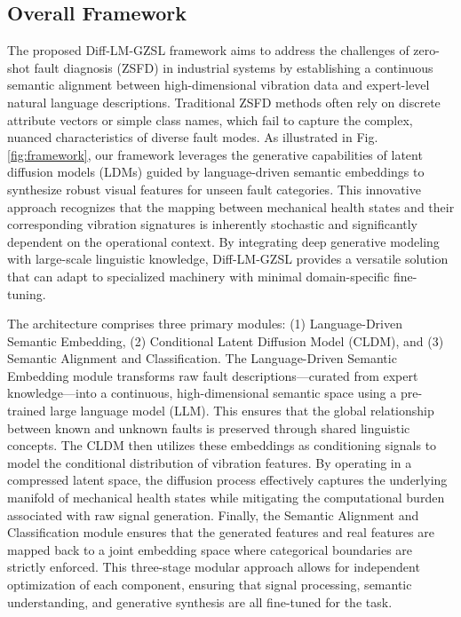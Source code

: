 \subsection{Overall Framework}
\label{sec:framework}
The proposed Diff-LM-GZSL framework aims to address the challenges of zero-shot fault diagnosis (ZSFD) in industrial systems by establishing a continuous semantic alignment between high-dimensional vibration data and expert-level natural language descriptions. Traditional ZSFD methods often rely on discrete attribute vectors or simple class names, which fail to capture the complex, nuanced characteristics of diverse fault modes. As illustrated in Fig. \ref{fig:framework}, our framework leverages the generative capabilities of latent diffusion models (LDMs) guided by language-driven semantic embeddings to synthesize robust visual features for unseen fault categories. This innovative approach recognizes that the mapping between mechanical health states and their corresponding vibration signatures is inherently stochastic and significantly dependent on the operational context. By integrating deep generative modeling with large-scale linguistic knowledge, Diff-LM-GZSL provides a versatile solution that can adapt to specialized machinery with minimal domain-specific fine-tuning.

The architecture comprises three primary modules: (1) Language-Driven Semantic Embedding, (2) Conditional Latent Diffusion Model (CLDM), and (3) Semantic Alignment and Classification. The Language-Driven Semantic Embedding module transforms raw fault descriptions—curated from expert knowledge—into a continuous, high-dimensional semantic space using a pre-trained large language model (LLM). This ensures that the global relationship between known and unknown faults is preserved through shared linguistic concepts. The CLDM then utilizes these embeddings as conditioning signals to model the conditional distribution of vibration features. By operating in a compressed latent space, the diffusion process effectively captures the underlying manifold of mechanical health states while mitigating the computational burden associated with raw signal generation. Finally, the Semantic Alignment and Classification module ensures that the generated features and real features are mapped back to a joint embedding space where categorical boundaries are strictly enforced. This three-stage modular approach allows for independent optimization of each component, ensuring that signal processing, semantic understanding, and generative synthesis are all fine-tuned for the task.

